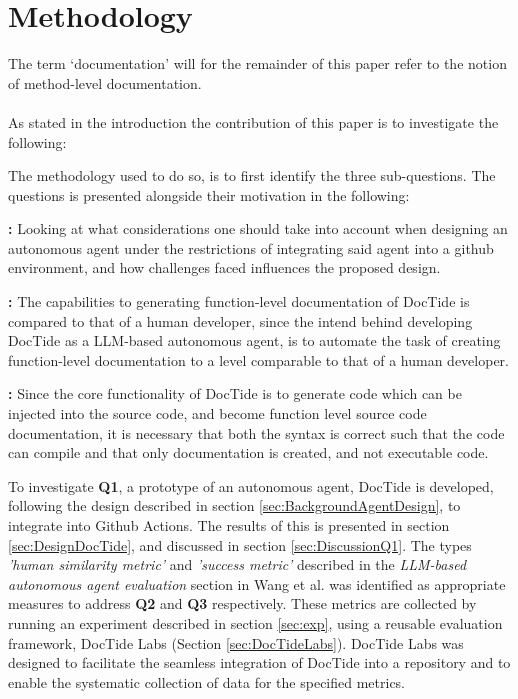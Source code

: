 \newcommand\itemb{\item[\textbf{Q2:}]}
\newcommand\itemc{\item[\textbf{Q3:}]}

\section{Methodology}
\label{sec:method}
The term `documentation' will for the remainder of this paper refer to the notion of method-level documentation.
\\ \\
As stated in the introduction the contribution of this paper is to investigate the following:
\begin{quote}
    \researchQuestion
\end{quote}
The methodology used to do so, is to first identify the three sub-questions. The questions is presented alongside their motivation in the following:

\begin{qlist}
    \item \subquestionI\textbf{:}
    Looking at what considerations one should take into account when designing an autonomous agent under the restrictions of integrating said agent into a github environment, and how challenges faced influences the proposed design.
    \itemb \subquestionII\textbf{:}
    The capabilities to generating function-level documentation of DocTide is compared to that of a human developer, since the intend behind developing DocTide as a LLM-based autonomous agent, is to automate the task of creating function-level documentation to a level comparable to that of a human developer.
    \itemc \subquestionIII\textbf{:}
    Since the core functionality of DocTide is to generate code which can be injected into the source code, and become function level source code documentation, it is necessary that both the syntax is correct such that the code can compile and that only documentation is created, and not executable code.
\end{qlist}


To investigate \textbf{Q1}, a prototype of an autonomous agent, DocTide is developed, following the design described in section \ref{sec:BackgroundAgentDesign}, to integrate into Github Actions. The results of this is presented in section \ref{sec:DesignDocTide}, and discussed in section \ref{sec:DiscussionQ1}. The types \textit{'human similarity metric'} and \textit{'success metric'} described in the \textit{LLM-based autonomous agent evaluation} section in Wang et al.\cite{wang2024survey} was identified as appropriate measures to address \textbf{Q2} and \textbf{Q3} respectively. These metrics are collected by running an experiment described in section \ref{sec:exp}, using a reusable evaluation framework, DocTide Labs (Section \ref{sec:DocTideLabs}). DocTide Labs was designed to facilitate the seamless integration of DocTide into a repository and to enable the systematic collection of data for the specified metrics.

